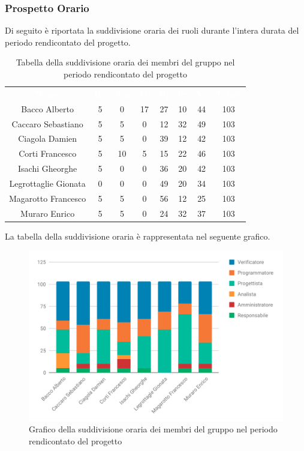 \subsubsection{Prospetto Orario}
Di seguito è riportata la suddivisione oraria dei ruoli durante l'intera durata del periodo rendicontato del progetto.


\begin{table}[H]	
	\begin{center}
	    \begin{tabular}{cccccccc}
			\rowcolor{greySWEight}
			\textcolor{white}{\textbf{Nome}} & \textcolor{white}{\textbf{Re}} & \textcolor{white}{\textbf{Am}} & \textcolor{white}{\textbf{An}} & \textcolor{white}{\textbf{Pj}} & \textcolor{white}{\textbf{Pr}} & \textcolor{white}{\textbf{Ve}} & \textcolor{white}{\textbf{Totale}}
			\\			

			Bacco Alberto & 5 & 0 & 17 & 27 & 10 & 44 & 103 \\
			Caccaro Sebastiano & 5 & 5 & 0 & 12 & 32 & 49 & 103 \\
			Ciagola Damien & 5 & 5 & 0 & 39 & 12 & 42 & 103 \\
			Corti Francesco & 5 & 10 & 5 & 15 & 22 & 46 & 103 \\
			Isachi Gheorghe & 5 & 0 & 0 & 36 & 20 & 42 & 103 \\
			Legrottaglie Gionata & 0 & 0 & 0 & 49 & 20 & 34 & 103 \\
			Magarotto Francesco & 5 & 5 & 0 & 56 & 12 & 25 & 103 \\
			Muraro Enrico & 5 & 5 & 0 & 24 & 32 & 37 & 103 \\
			\end{tabular}
	    \caption{Tabella della suddivisione oraria dei membri del gruppo nel periodo rendicontato del progetto} \label{tab:tabellaPersoneTotale} 
	\end{center}
\end{table}

La tabella della suddivisione oraria è rappresentata nel seguente grafico.
\begin{figure}[H]
	\includegraphics[width=1\linewidth]{Preventivo/grafici/TR1.pdf}
	\caption{Grafico della suddivisione oraria dei membri del gruppo nel periodo rendicontato del progetto}
\end{figure}

